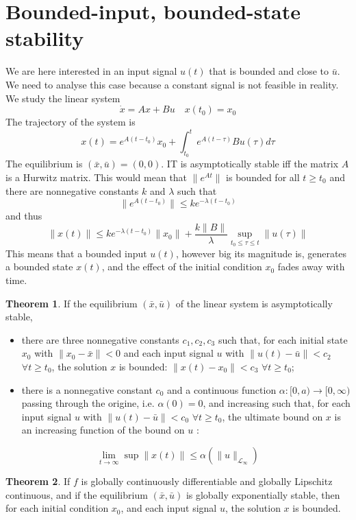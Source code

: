 \documentclass[12pt, openany]{report}
\theoremstyle{definition}
\newtheorem{thm}{Theorem}[chapter]
\begin{document}
\section{Bounded-input, bounded-state stability}
We are here interested in an input signal \(u(t)\) that is bounded and close to \(\bar u\). We need to analyse this case because a constant signal is not feasible in reality. We study the linear system
\begin{equation}
    \dot x = Ax+Bu \quad x(t_0) = x_0
\end{equation}
The trajectory of the system is
\begin{equation}
    x(t) = e^{A(t-t_0)}x_0 + \int_{t_0}^t e^{A(t-\tau)}Bu(\tau)d\tau
\end{equation}
The equilibrium is \((\bar x,\bar u)= (0,0)\). IT is asymptotically stable iff the matrix \(A\) is a Hurwitz matrix. This would mean that \(\lVert e^{At}\rVert\) is bounded for all \(t\ge t_0\) and there are nonnegative constants \(k\) and \(\lambda\) such that 
\begin{equation}
    \lVert e^{A(t-t_0)}\rVert \le ke^{-\lambda(t-t_0)}
\end{equation}
and thus
\begin{equation}
    \lVert x(t)\rVert \le ke^{-\lambda (t-t_0)}\lVert x_0\rVert + \frac{k\lVert B\rVert}{\lambda}\sup_{t_0\le \tau\le t}\lVert u(\tau)\rVert
\end{equation}
This means that a bounded input \(u(t)\), however big its magnitude is, generates a bounded state \(x(t)\), and the effect of the initial condition \(x_0\) fades away with time. 
\begin{thm}
    If the equilibrium \((\bar x, \bar u)\) of the linear system is asymptotically stable,
    \begin{itemize}
        \item there are three nonnegative constants \(c_1,c_2,c_3\) such that, for each initial state \(x_0\) with \(\lVert x_0-\bar x\rVert<0\) and each input signal \(u\) with \(\lVert u(t)-\bar u\rVert <c_2\) \(\forall t\ge t_0\), the solution \(x\) is bounded: \(\lVert x(t)-x_0\rVert <c_3\) \(\forall t\ge t_0\);
        \item there is a nonnegative constant \(c_0\) and a continuous function \(\alpha :[0,a)\rightarrow [0,\infty)\) passing through the origine, i.e. \(\alpha(0)=0\), and increasing such that, for each input signal \(u\) with \(\lVert u(t)-\bar u\rVert<c_0\) \(\forall t\ge t_0\), the ultimate bound on \(x\) is an increasing function of the bound on \(u\) :
    \end{itemize}
    \begin{equation}
        \lim_{t\rightarrow \infty}\sup \lVert x(t)\rVert \le \alpha(\lVert u\rVert_{\mathcal{L}_{\infty}})
    \end{equation}
\end{thm}
\begin{thm}
    If \(f\) is globally continuously differentiable and globally Lipschitz continuous, and if the equilibrium \((\bar x,\bar u)\) is globally exponentially stable, then for each initial condition \(x_0\), and each input signal \(u\), the solution \(x\) is bounded.
\end{thm}
\end{document}
